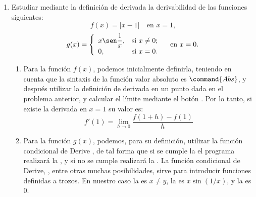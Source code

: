 \begin{enumerate}[leftmargin=*]
% 


\item Estudiar mediante la definición de derivada la derivabilidad de las funciones siguientes:
\[
f(x)=|x-1| \quad \textrm{en $x=1$,}
\]
\[
g(x)=\left\{
\begin{array}{ll}
x \sen\dfrac{1}{x}, & \hbox{si $x\neq 0$;} \\
0, & \hbox{si $x=0$.} \\
\end{array}
\right. \quad \textrm{en $x=0$.}
\]

\begin{indicacion}
\begin{enumerate}
\item Para la función $f(x)$, podemos inicialmente definirla, teniendo en cuenta que la sintaxis de la función valor absoluto es
$\command{Abs}$, y después utilizar la definición de derivada en un punto dada en el problema anterior, y calcular el límite mediante el
botón . Por lo tanto, si existe la derivada en $x=1$ su valor es:
\[
f'(1) = \mathop {\lim }\limits_{h \to 0} \frac{{f(1 + h) - f(1)}}
{h}
\]
\item Para la función $g(x)$, podemos, para su definición, utilizar la función condicional de Derive , de tal forma que si se cumple la  el programa realizará la , y si no se cumple realizará la
. La función condicional de Derive, , entre otras muchas posibilidades, sirve para introducir funciones
definidas a trozos. En nuestro caso la  es $x\neq y$, la  es $x\sin(1/x)$, y la  es
$0$.


\end{enumerate}
\end{indicacion}
\end{enumerate}
